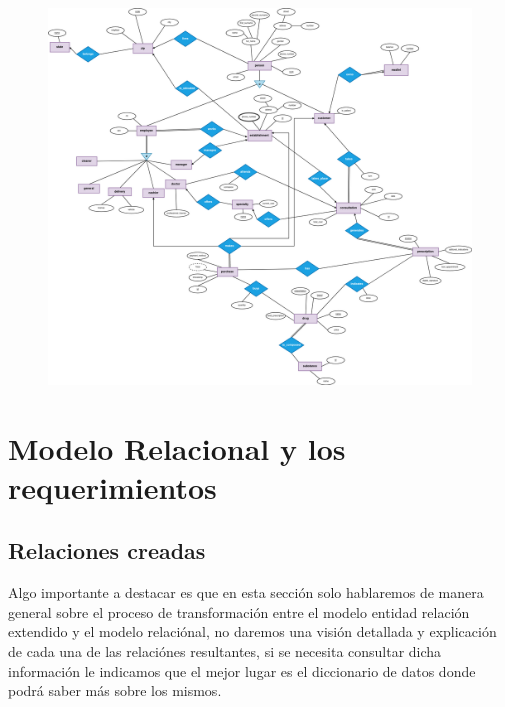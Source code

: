 \documentclass[12pt, fleqn]{report}                             %
\theoremstyle{break}                                            %
\begin{document}
        \begin{figure}[ht]
            \includegraphics[width=\textwidth]{Entidad_Relacion}
        \end{figure}


    \chapter{
       Modelo Relacional y los requerimientos}

      \section{Relaciones creadas}

        Algo importante a destacar es que en esta sección solo hablaremos de manera general sobre el proceso de transformación entre
        el modelo entidad relación extendido y el modelo relaciónal, no daremos una visión detallada y explicación de cada una de las 
        relaciónes resultantes, si se necesita consultar dicha información le indicamos que el mejor lugar es el diccionario de datos
        donde podrá saber más sobre los mismos.
\end{document}
